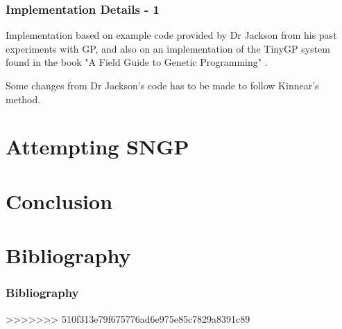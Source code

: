 \documentclass{beamer}
\begin{document}
\begin{frame}
\begin{frame}
		\end{frame}
	
		\begin{frame}
		
			\frametitle{Implementation Details - 1}
			
			Implementation based on example code provided by Dr Jackson from his past experiments with GP, and also on an implementation of the TinyGP system found in the book "A Field Guide to Genetic Programming" \cite{poli_field_2008}.
			
			Some changes from Dr Jackson's code has to be made to follow Kinnear's method.
		
		\end{frame}
	
	\section{Attempting SNGP}
	
	\section{Conclusion}
	
	\section{Bibliography}
	
		\begin{frame}[allowframebreaks] 
			\frametitle{Bibliography}
			
			
>>>>>>> 510f313e79f675776ad6e975e85c7829a8391c89
		\end{frame}
		
\end{document}
